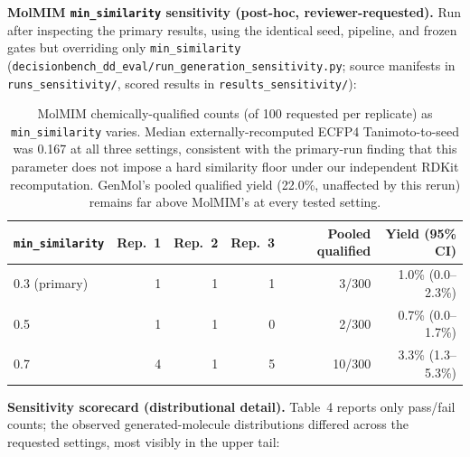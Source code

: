\documentclass{article}
\begin{document}
\textbf{MolMIM \texttt{min\_similarity} sensitivity (post-hoc, reviewer-requested).} Run after inspecting the primary results, using the identical seed, pipeline, and frozen gates but overriding only \texttt{min\_similarity} (\texttt{decisionbench\_dd\_eval/run\_generation\_sensitivity.py}; source manifests in \texttt{runs\_sensitivity/}, scored results in \texttt{results\_sensitivity/}):

\begin{table}[h]
\centering
\footnotesize
\begin{tabular}{lrrrrr}
\toprule
\texttt{min\_similarity} & Rep.\ 1 & Rep.\ 2 & Rep.\ 3 & Pooled qualified & Yield (95\% CI) \\
\midrule
0.3 (primary) & 1 & 1 & 1 & 3/300 & 1.0\% (0.0--2.3\%) \\
0.5 & 1 & 1 & 0 & 2/300 & 0.7\% (0.0--1.7\%) \\
0.7 & 4 & 1 & 5 & 10/300 & 3.3\% (1.3--5.3\%) \\
\bottomrule
\end{tabular}
\caption{MolMIM chemically-qualified counts (of 100 requested per replicate) as \texttt{min\_similarity} varies. Median externally-recomputed ECFP4 Tanimoto-to-seed was 0.167 at all three settings, consistent with the primary-run finding that this parameter does not impose a hard similarity floor under our independent RDKit recomputation. GenMol's pooled qualified yield (22.0\%, unaffected by this rerun) remains far above MolMIM's at every tested setting.}
\end{table}

\textbf{Sensitivity scorecard (distributional detail).} Table~4 reports only pass/fail counts; the observed generated-molecule distributions differed across the requested settings, most visibly in the upper tail:
\end{document}

